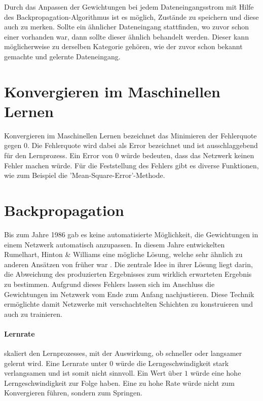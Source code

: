 Durch das Anpassen der Gewichtungen bei jedem Dateneingangsstrom mit Hilfe des Backpropagation-Algorithmus ist es möglich, Zustände zu speichern und diese auch zu merken. 
Sollte ein ähnlicher Dateneingang stattfinden, wo zuvor schon einer vorhanden war, dann sollte dieser ähnlich behandelt werden.
Dieser kann möglicherweise zu derselben Kategorie gehören, wie der zuvor schon bekannt gemachte und gelernte Dateneingang.

\section{Konvergieren im Maschinellen Lernen}
\label{sec:Konvergieren}

Konvergieren im Maschinellen Lernen bezeichnet das Minimieren der Fehlerquote gegen $0$.
Die Fehlerquote wird dabei als Error bezeichnet und ist ausschlaggebend für den Lernprozess.
Ein Error von $0$ würde bedeuten, dass das Netzwerk keinen Fehler machen würde.
Für die Feststellung des Fehlers gibt es diverse Funktionen, wie zum Beispiel die 'Mean-Square-Error'-Methode.

\section{Backpropagation}
\label{sec:Backpropagation}

Bis zum Jahre 1986 gab es keine automatisierte Möglichkeit, die Gewichtungen in einem Netzwerk automatisch anzupassen.
In diesem Jahre entwickelten Rumelhart, Hinton \& Williams eine mögliche Lösung, welche sehr ähnlich zu anderen Ansätzen von früher war \cite{hecht1988theory}.
Die zentrale Idee in ihrer Lösung liegt darin, die Abweichung des produzierten Ergebnisses zum wirklich erwarteten Ergebnis zu bestimmen. 
Aufgrund dieses Fehlers lassen sich im Anschluss die Gewichtungen im Netzwerk vom Ende zum Anfang nachjustieren. 
Diese Technik ermöglichte damit Netzwerke mit verschachtelten Schichten zu konstruieren und auch zu trainieren.

\paragraph{Lernrate} skaliert den Lernprozesses, mit der Auswirkung, ob schneller oder langsamer gelernt wird.
Eine Lernrate unter $0$ würde die Lerngeschwindigkeit stark verlangsamen und ist somit nicht sinnvoll. 
Ein Wert über $1$ würde eine hohe Lerngeschwindigkeit zur Folge haben. 
Eine zu hohe Rate würde nicht zum Konvergieren führen, sondern zum Springen.

